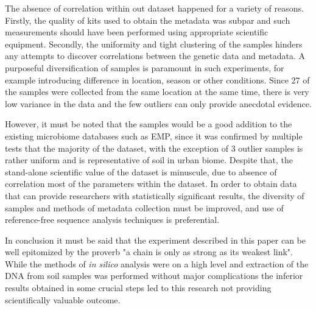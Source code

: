 \documentclass[12pt,twocolumn]{article} %
\begin{document}
\par
The absence of correlation within out dataset happened for a variety of reasons. Firstly, the quality of kits used to obtain the metadata was subpar and such measurements should have been performed using appropriate scientific equipment. Secondly, the uniformity and tight clustering of the samples hinders any attempts to discover correlations between the genetic data and metadata. A purposeful diversification of samples is paramount in such experiments, for example introducing difference in location, season or other conditions. Since 27 of the samples were collected from the same location at the same time, there is very low variance in the data and the few outliers can only provide anecdotal evidence.
\par
However, it must be noted that the samples would be a good addition to the existing microbiome databases such as EMP, since it was confirmed by multiple tests that the majority of the dataset, with the exception of 3 outlier samples is rather uniform and is representative of soil in urban biome. Despite that, the stand-alone scientific value of the dataset is minuscule, due to absence of correlation most of the parameters within the dataset. In order to obtain data that can provide researchers with statistically significant results, the diversity of samples and methods of metadata collection must be improved, and use of reference-free sequence analysis techniques is preferential.
\par
In conclusion it must be said that the experiment described in this paper can be well epitomized by the proverb "a chain is only as strong as its weakest link". While the methods of \textit{in silico} analysis were on a high level and extraction of the DNA from soil samples was performed without major complications the inferior results obtained in some crucial steps led to this research not providing scientifically valuable outcome. 


\end{document}
